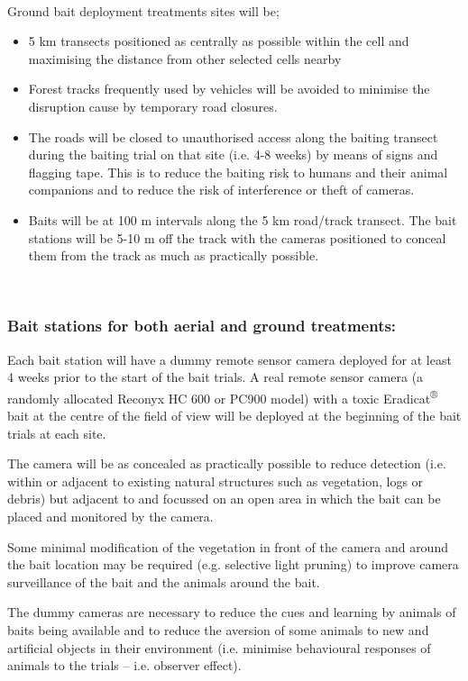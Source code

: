 \documentclass[version=last,
    paper=a4,                               %
    10pt,                                   %
    dvipsnames,
    oneside,                              %
    headings=openany,                       %
    open=any,
    BCOR=7mm,                               %
    DIV=15,     %
]{scrbook}
\begin{document}
~

Ground bait deployment treatments sites will be;

\begin{itemize}
\itemsep1pt\parskip0pt
\item
  5 km transects positioned as centrally as possible within the cell and
  maximising the distance from other selected cells nearby
\item
  Forest tracks frequently used by vehicles will be avoided to minimise
  the disruption cause by temporary road closures.
\item
  The roads will be closed to unauthorised access along the baiting
  transect during the baiting trial on that site (i.e. 4-8 weeks) by
  means of signs and flagging tape. This is to reduce the baiting risk
  to humans and their animal companions and to reduce the risk of
  interference or theft of cameras.
\item
  Baits will be at 100 m intervals along the 5 km road/track transect.
  The bait stations will be 5-10 m off the track with the cameras
  positioned to conceal them from the track as much as practically
  possible.
\end{itemize}

~

\subsubsection{Bait stations for both aerial and ground treatments:}

Each bait station will have a dummy remote sensor camera deployed for at
least 4 weeks prior to the start of the bait trials. A real remote
sensor camera (a randomly allocated Reconyx HC 600 or PC900 model) with
a toxic Eradicat\textsuperscript{®} bait at the centre of the field of
view will be deployed at the beginning of the bait trials at each site.

The camera will be as concealed as practically possible to reduce
detection (i.e. within or adjacent to existing natural structures such
as vegetation, logs or debris) but adjacent to and focussed on an open
area in which the bait can be placed and monitored by the camera.

Some minimal modification of the vegetation in front of the camera and
around the bait location may be required (e.g. selective light pruning)
to improve camera surveillance of the bait and the animals around the
bait.

The dummy cameras are necessary to reduce the cues and learning by
animals of baits being available and to reduce the aversion of some
animals to new and artificial objects in their environment (i.e.
minimise behavioural responses of animals to the trials -- i.e. observer
effect).
\end{document}
